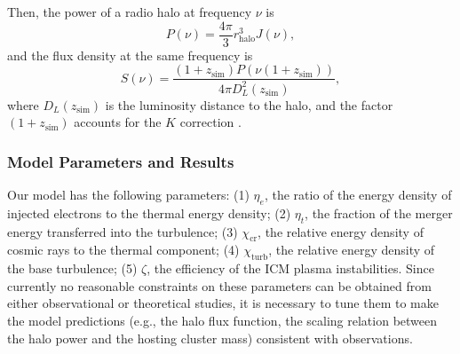 \documentclass[twocolumn]{aastex62}
\newcommand{\R}[1]{\mathrm{#1}}
\begin{document}
Then, the power of a radio halo at frequency $\nu$ is
\begin{equation}
  \label{eq:halo-power}
  P(\nu) = \frac{4\pi}{3} r_{\R{halo}}^3 J(\nu),
\end{equation}
and the flux density at the same frequency is
\begin{equation}
  \label{eq:halo-flux}
  S(\nu) = \frac{(1+z_{\R{sim}}) P(\nu(1+z_{\R{sim}}))}
    {4\pi D_{\!L}^2(z_{\R{sim}})} ,
\end{equation}
where $D_{\!L}(z_{\R{sim}})$ is the luminosity distance to the halo,
and the factor $(1 + z_{\R{sim}})$ accounts for the $K$ correction
\citep[e.g.,][]{hogg1999}.


\subsubsection{Model Parameters and Results}
\label{sec:halo-results}

Our model has the following parameters:
(1) $\eta_e$, the ratio of the energy density of injected electrons to
the thermal energy density;
(2) $\eta_t$, the fraction of the merger energy transferred into the
turbulence;
(3) $\chi_{\R{cr}}$, the relative energy density of cosmic rays to
the thermal component;
(4) $\chi_{\R{turb}}$, the relative energy density of the base turbulence;
(5) $\zeta$, the efficiency of the ICM plasma instabilities.
Since currently no reasonable constraints on these parameters can be
obtained from either observational or theoretical studies,
it is necessary to tune them to make the model predictions (e.g., the halo
flux function, the scaling relation between the halo power and the hosting
cluster mass) consistent with observations.
\end{document}
